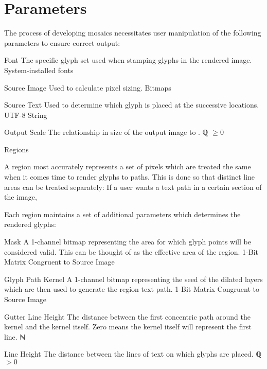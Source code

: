 \section{Parameters}
\label{apx:userparams}
The process of developing mosaics necessitates user manipulation of the following parameters to ensure correct output:
\begin{itemize}
  \paritem
  {Font}
  {The specific glyph set used when stamping glyphs in the rendered image.  }
  {System-installed fonts}
  {\FontParSymbol}

  \paritem
  {Source Image}
  {Used to calculate pixel sizing.}
  {Bitmaps}
  {\SrcImgParSymbol}

  \paritem
  {Source Text}
  {Used to determine which glyph is placed at the successive locations.}
  {UTF-8 String}
  {\SrcTxtParSymbol}

  \paritem
  {Output Scale}
  {The relationship in size of the output image to \SrcImgParSymbol.}
  {ℚ \(\geq 0\)}
  {\OutSclParSymbol}

  \pbodyitem
  {Regions}
  {
    \label{apx:regparams}
    A region most accurately represents a set of pixels which are treated the same when it comes time to render glyphs to paths.
    This is done so that distinct line areas can be treated separately:  If a user wants a text path in a certain section of the image,

    Each region maintains a set of additional parameters which determines the rendered glyphs:
    \begin{itemize}
      \paritem
      {Mask}
      {A 1-channel bitmap representing the area for which glyph points will be considered valid.
        This can be thought of as the effective area of the region.}
      {1-Bit Matrix Congruent to Source Image}
      {\RegMskParSymbol}
      
      \paritem
      {Glyph Path Kernel}
      {A 1-channel bitmap representing the seed of the dilated layers which are then used to generate the region text path.}
      {1-Bit Matrix Congruent to Source Image}
      {\GlyphPathKernelParSymbol}

      \paritem
      {Gutter Line Height}
      {The distance between the first concentric path around the kernel and the kernel itself.
        Zero means the kernel itself will represent the first line.}
      {ℕ}
      {\GtrHtParSymbol}

      \paritem
      {Line Height}
      {The distance between the lines of text on which glyphs are placed.}
      {ℚ \( > 0\)}
      {\LnHtParSymbol}


\end{itemize}}
\end{itemize}
